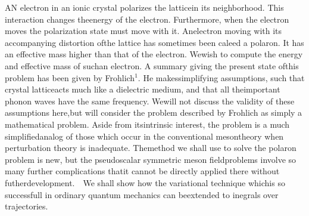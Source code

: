 \documentclass[8pt,a4paper]{extarticle}
\begin{document}
\begin{multicols}{2}
	\begin{flushleft}	
		\justify
		\lettrine{A}{N} electron in an ionic crystal polarizes the lattice\linebreak in its neighborhood. This interaction changes the\linebreak energy of the electron. Furthermore, when the electron \linebreak moves the polarization state must move with it. An\linebreak electron moving with its accompanying distortion of\linebreak the lattice has sometimes been caleed a polaron. It has an effective mass higher than that of the electron. We\linebreak wish to compute the energy and effective mass of such\linebreak an electron. A summary giving the present state of\linebreak this problem has been given by Frohlich${}^1$. He makes\linebreak simplifying assumptions, such that crystal lattice\linebreak acts much like a dielectric medium, and that all the\linebreak important phonon waves have the same frequency. We\linebreak will not discuss the validity of these assumptions here,\linebreak but will consider the problem described by Frohlich as simply a mathematical problem. Aside from its\linebreak intrinsic interest, the problem is a much simplified\linebreak analog of those which occur in the conventional meson\linebreak theory when perturbation theory is inadequate. The\linebreak method we shall use to solve the polaron problem is new, but the pseudoscalar symmetric meson field\linebreak problems involve so many further complications that\linebreak it cannot be directly applied there without futher\linebreak development.\linebreak ~~We shall show how the variational technique which\linebreak is so successfull in ordinary quantum mechanics can be\linebreak extended to inegrals over trajectories.


\end{flushleft}
\end{multicols}
\end{document}
